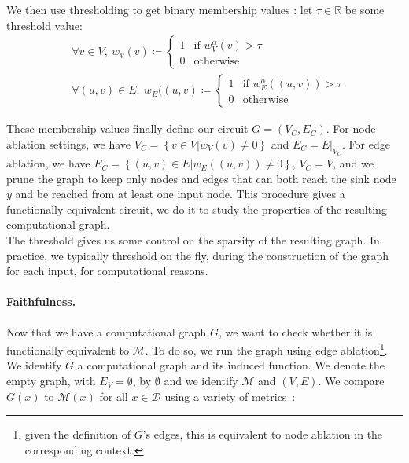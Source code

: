 \documentclass{article}
\newcommand{\R}{\mathbb{R}}
\begin{document}
We then use thresholding to get binary membership values : let $\tau \in \R$ be some threshold value:
\begin{align*}
    &\forall v \in V,~w_V(v) \coloneq
        \begin{cases} 
            1 & \text{if } w_V^\alpha(v) > \tau \\
            0 & \text{otherwise}
        \end{cases}\\
    &\forall (u, v) \in E,~w_E((u, v) \coloneq
        \begin{cases} 
            1 & \text{if } w_E^\alpha((u, v)) > \tau \\
            0 & \text{otherwise}
        \end{cases}
\end{align*}

These membership values finally define our circuit $G=(V_C, E_C)$. For node ablation settings, we have $V_C = \left\{v \in V | w_V(v) \ne 0\right\}$ and $E_C = E|_{V_C}$. For edge ablation, we have $E_C = \left\{(u, v) \in E | w_E((u,v)) \ne 0\right\}$, $V_C = V$, and we prune the graph to keep only nodes and edges that can both reach the sink node $y$ and be reached from at least one input node. This procedure gives a functionally equivalent circuit, we do it to study the properties of the resulting computational graph.\\

The threshold gives us some control on the sparsity of the resulting graph. In practice, we typically threshold on the fly, during the construction of the graph for each input, for computational reasons.

\paragraph{Faithfulness.}Now that we have a computational graph $G$, we want to check whether it is functionally equivalent to $\mathcal{M}$. To do so, we run the graph using edge ablation\footnote{given the definition of $G$'s edges, this is equivalent to node ablation in the corresponding context.}. We identify $G$ a computational graph and its induced function. We denote the empty graph, with $E_V = \emptyset$, by $\emptyset$ and we identify $\mathcal{M}$ and $(V, E)$. We compare $G(x)$ to $\mathcal{M}(x)$ for all $x \in \mathcal{D}$ using a variety of metrics~:
\end{document}
